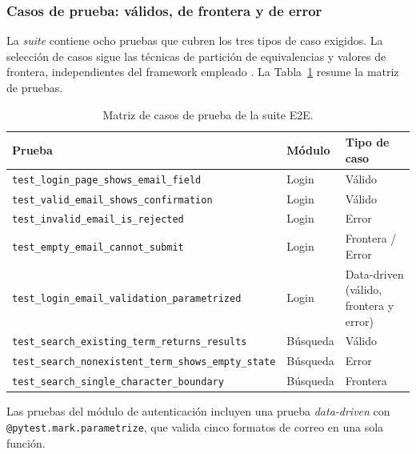 \documentclass[12pt]{article}
\begin{document}
\subsubsection{Casos de prueba: válidos, de frontera y de error}

La \textit{suite} contiene ocho pruebas que cubren los tres tipos de caso
exigidos. La selección de casos sigue las técnicas de partición de equivalencias
y valores de frontera, independientes del framework empleado
\citep{aniche2022}. La Tabla~\ref{tab:casos} resume la matriz de pruebas.

\begin{table}[htbp]
\centering
\footnotesize
\caption{Matriz de casos de prueba de la suite E2E.}
\label{tab:casos}
\renewcommand{\arraystretch}{1.2}
\begin{tabularx}{\textwidth}{>{\RaggedRight\arraybackslash}p{}
                             >{\RaggedRight\arraybackslash}p{}
                             >{\RaggedRight\arraybackslash}X}
\toprule
\textbf{Prueba} & \textbf{Módulo} & \textbf{Tipo de caso} \\
\midrule
\texttt{test\_login\_page\_shows\_email\_field} & Login & Válido \\
\texttt{test\_valid\_email\_shows\_confirmation} & Login & Válido \\
\texttt{test\_invalid\_email\_is\_rejected} & Login & Error \\
\texttt{test\_empty\_email\_cannot\_submit} & Login & Frontera / Error \\
\texttt{test\_login\_email\_validation\_parametrized} & Login & Data-driven (válido, frontera y error) \\
\texttt{test\_search\_existing\_term\_returns\_results} & Búsqueda & Válido \\
\texttt{test\_search\_nonexistent\_term\_shows\_empty\_state} & Búsqueda & Error \\
\texttt{test\_search\_single\_character\_boundary} & Búsqueda & Frontera \\
\bottomrule
\end{tabularx}
\end{table}

Las pruebas del módulo de autenticación incluyen una prueba \textit{data-driven}
con \texttt{@pytest.mark.parametrize}, que valida cinco formatos de correo en una
sola función.
\end{document}

